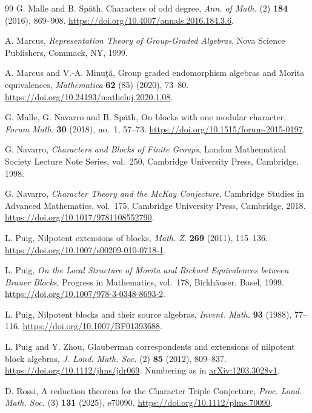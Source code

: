 \documentclass[11pt,a4paper]{article}
\theoremstyle{definition}
\theoremstyle{remark}
\numberwithin{equation}{section}
\begin{document}
\begin{thebibliography}{99}
		 G. Malle and B. Sp\"ath, Characters of odd degree, \textit{Ann. of Math.} (2) \textbf{184} (2016), 869--908. \url{https://doi.org/10.4007/annals.2016.184.3.6}.
		
		 A. Marcus, \textit{Representation Theory of Group-Graded Algebras}, Nova Science Publishers, Commack, NY, 1999.
		
		 A. Marcus and V.-A. Minu\c{t}\u{a}, Group graded endomorphism algebras and Morita equivalences, \textit{Mathematica} \textbf{62} (85) (2020), 73--80. \url{https://doi.org/10.24193/mathcluj.2020.1.08}.
		
		 G. Malle, G. Navarro and B. Sp\"ath, On blocks with one modular character, \textit{Forum Math.} \textbf{30} (2018), no.~1, 57--73. \url{https://doi.org/10.1515/forum-2015-0197}.
		
		 G. Navarro, \textit{Characters and Blocks of Finite Groups}, London Mathematical Society Lecture Note Series, vol.~250, Cambridge University Press, Cambridge, 1998.
		
		 G. Navarro, \textit{Character Theory and the McKay Conjecture}, Cambridge Studies in Advanced Mathematics, vol.~175, Cambridge University Press, Cambridge, 2018. \url{https://doi.org/10.1017/9781108552790}.
		
		 L. Puig, Nilpotent extensions of blocks, \textit{Math. Z.} \textbf{269} (2011), 115--136. \url{https://doi.org/10.1007/s00209-010-0718-1}.
		
		 L. Puig, \textit{On the Local Structure of Morita and Rickard Equivalences between Brauer Blocks}, Progress in Mathematics, vol.~178, Birkh\"auser, Basel, 1999. \url{https://doi.org/10.1007/978-3-0348-8693-2}.
		
		 L. Puig, Nilpotent blocks and their source algebras, \textit{Invent. Math.} \textbf{93} (1988), 77--116. \url{https://doi.org/10.1007/BF01393688}.
		
		 L. Puig and Y. Zhou, Glauberman correspondents and extensions of nilpotent block algebras, \textit{J. Lond. Math. Soc.} (2) \textbf{85} (2012), 809--837. \url{https://doi.org/10.1112/jlms/jdr069}. Numbering as in \href{https://arxiv.org/abs/1203.3028v1}{arXiv:1203.3028v1}.
		
		 D. Rossi, A reduction theorem for the Character Triple Conjecture, \textit{Proc. Lond. Math. Soc.} (3) \textbf{131} (2025), e70090. \url{https://doi.org/10.1112/plms.70090}.
		

\end{thebibliography}
\end{document}

